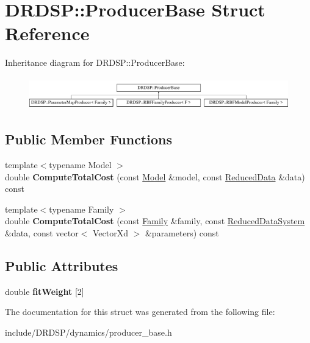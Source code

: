 \hypertarget{struct_d_r_d_s_p_1_1_producer_base}{\section{D\-R\-D\-S\-P\-:\-:Producer\-Base Struct Reference}
\label{struct_d_r_d_s_p_1_1_producer_base}
}
Inheritance diagram for D\-R\-D\-S\-P\-:\-:Producer\-Base\-:\begin{figure}[H]
\begin{center}
\leavevmode
\includegraphics[height=1.408805cm]{struct_d_r_d_s_p_1_1_producer_base}
\end{center}
\end{figure}
\subsection*{Public Member Functions}
\begin{DoxyCompactItemize}
\item 
\hypertarget{struct_d_r_d_s_p_1_1_producer_base_addbb029e21d29fc090c177509d7bcd3f}{{\footnotesize template$<$typename Model $>$ }\\double {\bfseries Compute\-Total\-Cost} (const \hyperlink{struct_d_r_d_s_p_1_1_model}{Model} \&model, const \hyperlink{struct_d_r_d_s_p_1_1_reduced_data}{Reduced\-Data} \&data) const }\label{struct_d_r_d_s_p_1_1_producer_base_addbb029e21d29fc090c177509d7bcd3f}

\item 
\hypertarget{struct_d_r_d_s_p_1_1_producer_base_a3e47c61d879ea97d767641adeecb1ac8}{{\footnotesize template$<$typename Family $>$ }\\double {\bfseries Compute\-Total\-Cost} (const \hyperlink{struct_d_r_d_s_p_1_1_family}{Family} \&family, const \hyperlink{struct_d_r_d_s_p_1_1_reduced_data_system}{Reduced\-Data\-System} \&data, const vector$<$ Vector\-Xd $>$ \&parameters) const }\label{struct_d_r_d_s_p_1_1_producer_base_a3e47c61d879ea97d767641adeecb1ac8}

\end{DoxyCompactItemize}
\subsection*{Public Attributes}
\begin{DoxyCompactItemize}
\item 
\hypertarget{struct_d_r_d_s_p_1_1_producer_base_ac8a769138a797ad3cf75d6280a7163d1}{double {\bfseries fit\-Weight} \mbox{[}2\mbox{]}}\label{struct_d_r_d_s_p_1_1_producer_base_ac8a769138a797ad3cf75d6280a7163d1}

\end{DoxyCompactItemize}


The documentation for this struct was generated from the following file\-:\begin{DoxyCompactItemize}
\item 
include/\-D\-R\-D\-S\-P/dynamics/producer\-\_\-base.\-h\end{DoxyCompactItemize}
